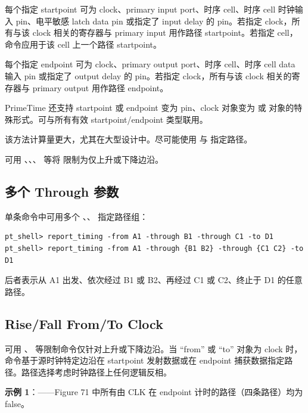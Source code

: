 每个指定 startpoint 可为 clock、primary input port、时序 cell、时序 cell 时钟输入 pin、电平敏感 latch data pin 或指定了 input delay 的 pin。若指定 clock，所有与该 clock 相关的寄存器与 primary input 用作路径 startpoint。若指定 cell，命令应用于该 cell 上一个路径 startpoint。

每个指定 endpoint 可为 clock、primary output port、时序 cell、时序 cell data 输入 pin 或指定了 output delay 的 pin。若指定 clock，所有与该 clock 相关的寄存器与 primary output 用作路径 endpoint。

PrimeTime 还支持 startpoint 或 endpoint 变为  pin、clock 对象变为  或  对象的特殊形式。可与所有有效 startpoint/endpoint 类型联用。

\begin{noteBox}
该方法计算量更大，尤其在大型设计中。尽可能使用  与  指定路径。
\end{noteBox}

可用 、、、 等将  限制为仅上升或下降边沿。

\subsection{多个 Through 参数}
单条命令中可用多个 、、 指定路径组：
\begin{lstlisting}
pt_shell> report_timing -from A1 -through B1 -through C1 -to D1
pt_shell> report_timing -from A1 -through {B1 B2} -through {C1 C2} -to D1
\end{lstlisting}

后者表示从 A1 出发、依次经过 B1 或 B2、再经过 C1 或 C2、终止于 D1 的任意路径。

\subsection{Rise/Fall From/To Clock}
可用 、 等限制命令仅针对上升或下降边沿。当 ``from'' 或 ``to'' 对象为 clock 时，命令基于源时钟特定边沿在 startpoint 发射数据或在 endpoint 捕获数据指定路径。路径选择考虑时钟路径上任何逻辑反相。


\textbf{示例 1}：——Figure 71 中所有由 CLK 在 endpoint 计时的路径（四条路径）均为 false。

